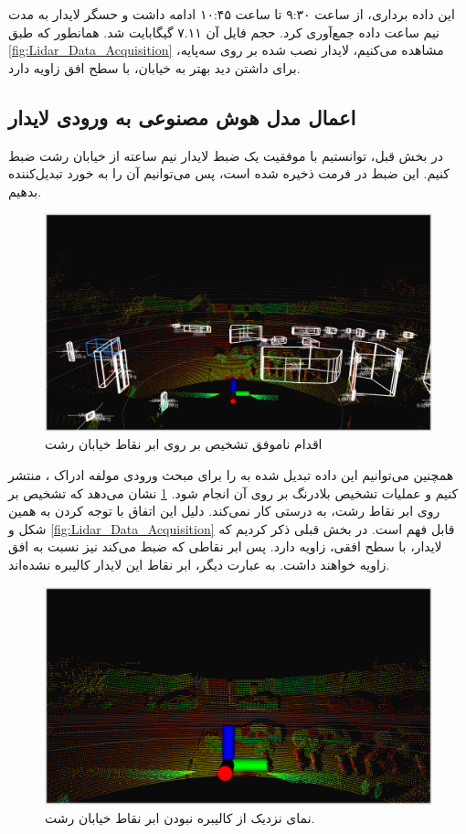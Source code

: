 این داده برداری، از ساعت ۹:۳۰ تا ساعت ۱۰:۴۵ ادامه داشت و حسگر لایدار به مدت نیم ساعت داده جمع‌آوری کرد. حجم فایل  آن ۷.۱۱ گیگابایت شد.  همانطور که طبق \cref{fig:Lidar_Data_Acquisition} مشاهده می‌کنیم، لایدار نصب شده بر روی سه‌پایه، برای داشتن دید بهتر به خیابان، با سطح افق زاویه دارد. 

\subsection{اعمال مدل هوش‌ مصنوعی به ورودی لایدار}
در بخش قبل، توانستیم با موفقیت یک ضبط لایدار نیم ساعته از خیابان رشت ضبط کنیم. این ضبط در فرمت  ذخیره شده است، پس می‌توانیم آن را به خورد تبدیل‌کننده  بدهیم. \begin{figure}[h]
    \centering
    \includegraphics[width=0.9\linewidth]{figures/Rasht_Uncalibrated_Detection_Attempt.png}
    \caption{اقدام ناموفق تشخیص بر روی ابر‌ نقاط خیابان رشت}
    \label{fig:Rasht_Uncalibrated_Detection_Attempt}
\end{figure}
همچنین می‌توانیم این داده تبدیل‌ شده به  را برای مبحث ورودی مولفه ادراک ، منتشر کنیم و عملیات تشخیص بلادرنگ بر روی آن انجام شود. \cref{fig:Rasht_Uncalibrated_Detection_Attempt} نشان می‌دهد که تشخیص بر روی ابر نقاط رشت، به درستی کار نمی‌کند. دلیل این اتفاق با توجه کردن به همین شکل و \cref{fig:Lidar_Data_Acquisition} قابل فهم است. در بخش قبلی ذکر کردیم که لایدار، با سطح افقی، زاویه دارد. پس ابر‌ نقاطی که ضبط می‌کند نیز نسبت به افق زاویه خواهند داشت. به عبارت دیگر، ابر نقاط این لایدار کالیبره نشده‌اند.
\begin{figure}
    \centering
    \includegraphics[width=1\linewidth]{figures/Rasht_Uncalibrated_Pointcloud.png}
    \caption{نمای نزدیک از کالیبره نبودن ابر نقاط خیابان رشت.}
    \label{fig:Rasht_Uncalibrated_Pointcoud}
\end{figure}

